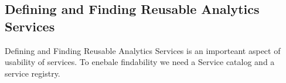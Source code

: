 
\subsection{Defining and Finding Reusable Analytics Services}
\label{sec:defining}

Defining and Finding Reusable Analytics Services is an importeant
aspect of usability of services. To enebale findability we need a
Service catalog and a service registry.

